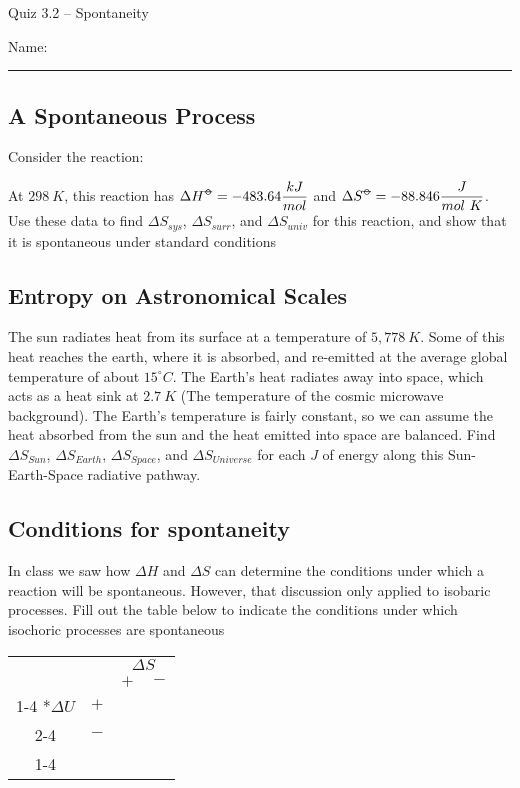 \documentclass[11pt, letterpaper]{memoir}
\begin{document}
	\begin{center}
		{\large Quiz 3.2 -- Spontaneity}
	\end{center}
	{\large Name: \rule[-1mm]{4in}{.1pt} 

\subsection*{A Spontaneous Process}

Consider the reaction: 

\noindent
At $298~K$, this reaction has $\Delta H^{\std} = -483.64\dfrac{kJ}{mol}$ and $\Delta S^{\std}= -88.846\dfrac{J}{mol~K}$. Use these data to find $\Delta S_{sys}$, $\Delta S_{surr}$, and $\Delta S_{univ}$ for this reaction, and show that it is spontaneous under standard conditions

\vspace{4em}
\subsection*{Entropy on Astronomical Scales}
The sun radiates heat from its surface at a temperature of $5,778~K$. Some of this heat reaches the earth, where it is absorbed, and re-emitted at the average global temperature of about $15 ^\circ C$. The Earth's heat radiates away into space, which acts as a heat sink at $2.7~K$ (The temperature of the cosmic microwave background). The Earth's temperature is fairly constant, so we can assume the heat absorbed from the sun and the heat emitted into space are balanced. Find $\Delta S_{Sun}$, $\Delta S_{Earth}$, $\Delta S_{Space}$, and $\Delta S_{Universe}$ for each $J$ of energy along this Sun-Earth-Space radiative pathway.


\vspace{10em}
\subsection*{Conditions for spontaneity}
In class we saw how $\Delta H$ and $\Delta S$ can determine the conditions under which a reaction will be spontaneous. However, that discussion only applied to isobaric processes. Fill out the table below to indicate the conditions under which isochoric processes are spontaneous

\begin{center}
	\begin{tabular}{cc|c|c|}
		&&\multicolumn{2}{c|}{$\Delta S$} \\
		&& $+$ & $-$ \\ \cline{1-4}
		\multirow{2}*{$\Delta U$} &$+$&~\hspace{12em}~& ~\hspace{12em}~\\  \cline{2-4}
		&$-$&& \\ \cline{1-4}
		

\end{tabular}
\end{center}}
\end{document}
